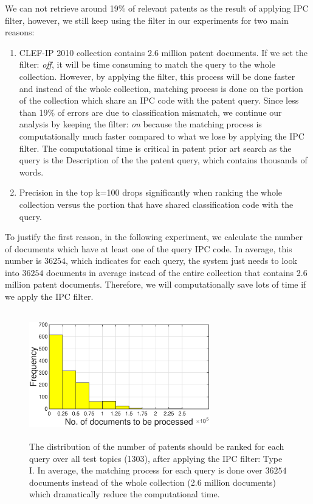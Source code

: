 We can not retrieve around 19\% of relevant patents as the result of applying IPC filter, however, we still keep using the filter in our experiments for two main reasons: 
\begin{enumerate}
\item CLEF-IP 2010 collection contains 2.6 million patent documents. If we set the filter: \textit{off}, it will be time consuming to match the query to the whole collection. However, by applying the filter, this process will be done faster and instead of the whole collection, matching process is done on the portion of the collection which share an IPC code with the patent query. Since less than 19\% of errors are due to classification mismatch, we continue our analysis by keeping the filter: \textit{on} because the matching process is computationally much faster compared to what we lose by applying the IPC filter. The computational time is critical in patent prior art search as the query is the Description of the the patent query, which contains thousands of words.   
\item Precision in the top k=100 drops significantly when ranking the whole collection versus the portion that have shared classification code with the query.  
\end{enumerate}

To justify the first reason, in the following experiment, we calculate the number of documents which have at least one of the query IPC code. In average, this number is $ 36254 $, which indicates for each query, the system just needs to look into $ 36254 $ documents in average instead of the entire collection that contains 2.6 million patent documents. Therefore, we will computationally save lots of time if we apply the IPC filter.  
\begin{figure}[t!]
   \centering
   \includegraphics[width=0.70\textwidth,height=55mm]{figs/filter1}
   \caption{The distribution of the number of patents should be ranked for each query over all test topics (1303), after applying the IPC filter: Type I.
In average, the matching process for each query is done over $ 36254 $ documents instead of the whole collection (2.6 million documents) which dramatically reduce the computational time.}   
   \label{fig:ipcfilter-histo} 
\end{figure}

